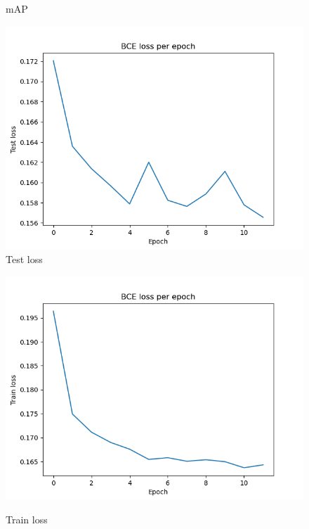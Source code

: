\documentclass[12pt, letterpaper, twoside]{article}
\begin{document}
\begin{figure}[ht]
\begin{minipage}[b]{0.5\linewidth}
    \caption{mAP} 
    \vspace{4ex}
  \end{minipage} 
  \begin{minipage}[b]{0.5\linewidth}
    \centering
    \includegraphics[scale=0.5]{"Task1_testlosses.png"}\\ 
    \caption{Test loss} 
    \vspace{4ex}
  \end{minipage}%
  \begin{minipage}[b]{0.5\linewidth}
    \centering
    \includegraphics[scale=0.5]{"Task1_trainlosses.png"}\\
    \caption{Train loss} 
    \vspace{4ex}
  \end{minipage} 
\end{figure}
\end{document}
